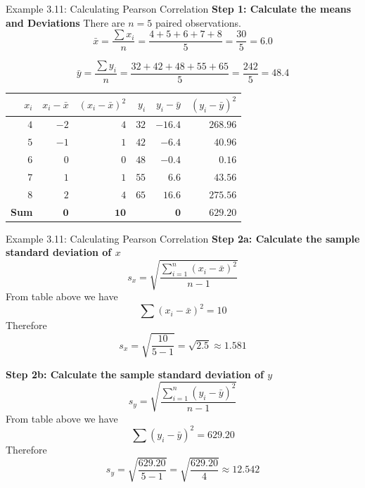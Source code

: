 \documentclass[aspectratio=169]{beamer}
\begin{document}
\begin{frame}{Example 3.11: Calculating Pearson Correlation}
\footnotesize
\textbf{Step 1: Calculate the means and Deviations}
There are $n=5$ paired observations.
$$
	\bar{x}=\frac{\sum x_i}{n} =\frac{4+5+6+7+8}{5} =\frac{30}{5} =6.0
$$

$$
	\bar{y}=\frac{\sum y_i}{n} =\frac{32+42+48+55+65}{5}=\frac{242}{5} =48.4
$$

\begin{center}
\setlength{\tabcolsep}{6pt}
\renewcommand{\arraystretch}{1.15}
\begin{tabular}{rrr|rrr}
\toprule
$x_i$ & $x_i-\bar{x}$ & $(x_i-\bar{x})^2$ & $y_i$ & $y_i-\bar{y}$ & $(y_i-\bar{y})^2$ \\
\midrule
$4$ & $-2$ & $4$ & $32$ & $-16.4$ & $268.96$ \\
$5$ & $-1$ & $1$ & $42$ & $-6.4$ & $40.96$ \\
$6$ & $0$ & $0$ & $48$ & $-0.4$ & $0.16$ \\
$7$ & $1$ & $1$ & $55$ & $6.6$ & $43.56$ \\
$8$ & $2$ & $4$ & $65$ & $16.6$ & $275.56$ \\
\midrule
\textbf{Sum}& $\mathbf{0}$& $\mathbf{10}$& {}& $\mathbf{0}$& $\mathbf{629.20}$ \\
\bottomrule
\end{tabular}
\end{center}
\end{frame}

\begin{frame}{Example 3.11: Calculating Pearson Correlation}
\footnotesize
\textbf{Step 2a: Calculate the sample standard deviation of $x$}
\[
s_x=\sqrt{\frac{\sum_{i=1}^{n}(x_i-\bar{x})^2}{n-1}}
\]
From table above we have
\[
\sum (x_i-\bar{x})^2 = 10 
\]
Therefore
\[
s_x=\sqrt{\frac{10}{5-1}} =\sqrt{2.5}\approx 1.581
\]

\textbf{Step 2b: Calculate the sample standard deviation of $y$}
\[
s_y=\sqrt{\frac{\sum_{i=1}^{n}(y_i-\bar{y})^2}{n-1}}
\]
From table above we have
\[
\sum (y_i-\bar{y})^2 = 629.20
\]
Therefore
\[
s_y=\sqrt{\frac{629.20}{5-1}} =\sqrt{\frac{629.20}{4}} \approx 12.542
\]


\end{frame}
\end{document}
